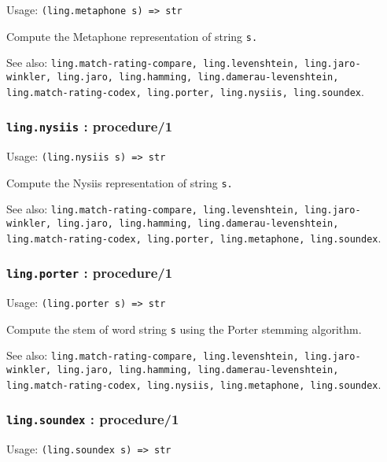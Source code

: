 \documentclass[
]{article}
\newcommand{\passthrough}[1]{#1}
\begin{document}
Usage: \passthrough{\lstinline!(ling.metaphone s) => str!}

Compute the Metaphone representation of string
\passthrough{\lstinline!s.!}

See also:
\passthrough{\lstinline!ling.match-rating-compare, ling.levenshtein, ling.jaro-winkler, ling.jaro, ling.hamming, ling.damerau-levenshtein, ling.match-rating-codex, ling.porter, ling.nysiis, ling.soundex!}.

\hypertarget{ling.nysiis-procedure1}{%
\subsubsection{\texorpdfstring{\texttt{ling.nysiis} :
procedure/1}{ling.nysiis : procedure/1}}\label{ling.nysiis-procedure1}}

Usage: \passthrough{\lstinline!(ling.nysiis s) => str!}

Compute the Nysiis representation of string \passthrough{\lstinline!s.!}

See also:
\passthrough{\lstinline!ling.match-rating-compare, ling.levenshtein, ling.jaro-winkler, ling.jaro, ling.hamming, ling.damerau-levenshtein, ling.match-rating-codex, ling.porter, ling.metaphone, ling.soundex!}.

\hypertarget{ling.porter-procedure1}{%
\subsubsection{\texorpdfstring{\texttt{ling.porter} :
procedure/1}{ling.porter : procedure/1}}\label{ling.porter-procedure1}}

Usage: \passthrough{\lstinline!(ling.porter s) => str!}

Compute the stem of word string \passthrough{\lstinline!s!} using the
Porter stemming algorithm.

See also:
\passthrough{\lstinline!ling.match-rating-compare, ling.levenshtein, ling.jaro-winkler, ling.jaro, ling.hamming, ling.damerau-levenshtein, ling.match-rating-codex, ling.nysiis, ling.metaphone, ling.soundex!}.

\hypertarget{ling.soundex-procedure1}{%
\subsubsection{\texorpdfstring{\texttt{ling.soundex} :
procedure/1}{ling.soundex : procedure/1}}\label{ling.soundex-procedure1}}

Usage: \passthrough{\lstinline!(ling.soundex s) => str!}
\end{document}
